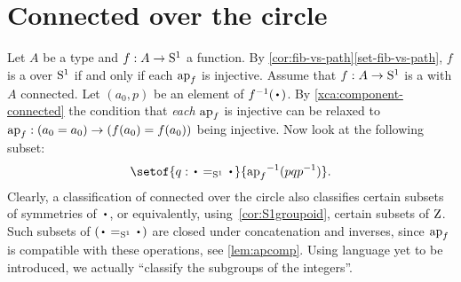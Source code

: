 \section{Connected \coverings over the circle}
\label{sec:covS1}

Let $A$ be a type and $f:A\to {\mathrm{S}^1}$ a function.
By \cref{cor:fib-vs-path}\ref{set-fib-vs-path}, $f$ is a \covering
over ${\mathrm{S}^1}$ if and only if each $\ap{f}$ is injective.
Assume that $f:A\to {\mathrm{S}^1}$ is a \covering with $A$ connected.
Let $(a_0,p)$ be an element of $f^{-1}(\base)$.
By \cref{xca:component-connected}
the condition that \emph{each} $\ap{f}$ is injective
can be relaxed to $\ap{f}: (a_0=a_0)\to(f(a_0)=f(a_0))$ being injective.
Now look at the following subset:
\begin{equation}\label{eq:subgroup-covering-1}
  \setof{q: \base =_\Sc \base}{{\ap{f}}^{-1}(pqp^{-1})}.
\end{equation}
Clearly, a classification of connected \coverings over the circle
also classifies certain subsets of symmetries of $\base$,
or equivalently, using~\cref{cor:S1groupoid}, certain subsets of $\mathrm{Z}$.
Such subsets of $(\base=_\Sc\base)$ are closed under concatenation and inverses,
since $\ap{f}$ is compatible with these operations,
see \cref{lem:apcomp}.
Using language yet to be introduced, we actually ``classify the subgroups of the integers''.

